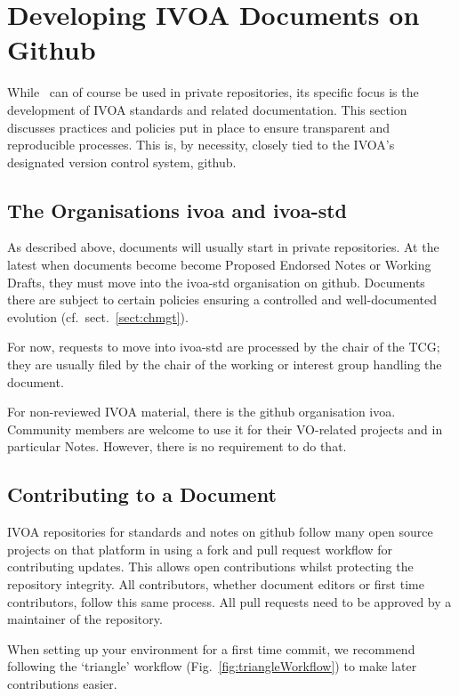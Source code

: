 \documentclass[11pt,a4paper]{ivoa}
\begin{document}
\section{Developing IVOA Documents on Github}
\label{sect:ivoapol}

While \ivoatex\ can of course be used in private repositories, its
specific focus is the development of IVOA standards and related
documentation.  This section discusses practices and policies put in
place to ensure transparent and reproducible processes.  This is, by
necessity, closely tied to the IVOA's designated version control system,
github.


\subsection{The Organisations ivoa and ivoa-std}

As described above, documents will usually start in private
repositories.  At the latest when documents become become Proposed
Endorsed Notes or Working Drafts, they must move into the ivoa-std
organisation on github.
Documents there are subject to certain policies ensuring
a controlled and well-documented evolution (cf.~sect.~\ref{sect:chmgt}).

For now, requests to move into ivoa-std are processed by the chair of
the TCG; they are usually filed by the chair of the working or interest
group handling the document.

For non-reviewed IVOA material, there is the github organisation ivoa.
Community members are welcome to use it for their VO-related projects
and in particular Notes.  However, there is no requirement to do that.


\subsection{Contributing to a Document}
\label{sect:contributing}

IVOA repositories for standards and notes on github follow many
open source projects on that platform in using a fork
and pull request workflow for contributing
updates. This allows open contributions whilst protecting the repository
integrity. All contributors, whether document editors or first time
contributors, follow this same process. All pull requests need to be
approved by a maintainer of the repository.

When setting up your environment for a first time commit, we recommend
following the `triangle' workflow (Fig.~\ref{fig:triangleWorkflow}) to
make later contributions easier.
\end{document}
